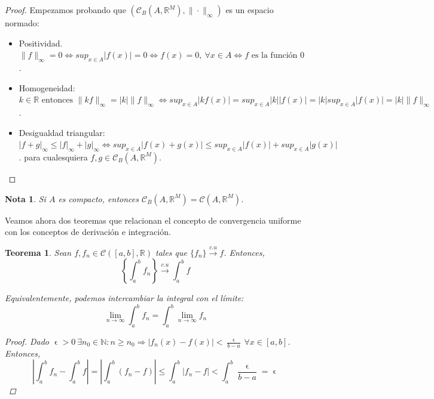 \documentclass[11pt, a4paper]{article}
\let\epsilon\upvarepsilon
\newcommand{\fn}{\{f_n\}}
\theoremstyle{theorem-style}
\newtheorem{nth}{Teorema}[section]
\theoremstyle{definition-style}
\theoremstyle{remark-style}
\newtheorem*{nota}{Nota}
\theoremstyle{example-style}
\begin{document}
\begin{proof}
	Empezamos probando que $(\mathcal{C}_B(A, \mathbb R^M), \|\cdot \|_\infty)$ es un espacio normado:
	\begin{itemize}
\item Positividad. $\|f\|_\infty=0 \iff sup_{x \in A}|f(x)|=0 \iff f(x)=0, \ \forall x \in A \iff f \text{ es la función } 0$.
\item Homogeneidad: $k \in \mathbb R \text{ entonces } \|kf\|_\infty=|k|\|f\|_\infty \iff sup_{x \in A}|kf(x)|=sup_{x \in A}|k||f(x)|=|k|sup_{x \in A}|f(x)| = |k| \| f\|_\infty$.
\item Desigualdad triangular:
$|f+g|_\infty \leq |f|_\infty + |g|_\infty\iff sup_{x \in A}|f(x)+g(x)| \leq sup_{x \in A}|f(x)| + sup_{x \in A}|g(x)|$.
para cualesquiera $f, g \in \mathcal{C}_B(A, \mathbb R^M)$.
\end{itemize}
\end{proof}

\begin{nota}
Si $A$ es compacto, entonces  $\mathcal{C}_B(A,\mathbb{R}^M) = \mathcal{C}(A, \mathbb{R}^M)$.
\end{nota}

Veamos ahora dos teoremas que relacionan el concepto de convergencia uniforme con los conceptos de derivación e integración.

\begin{nth} Sean $f, f_n \in \mathcal{C}([a,b],\mathbb{R})$ tales que $\fn \xrightarrow {c.u} f$. Entonces, $$\left\{\int_a^b f_n\right\} \xrightarrow {c.u} \int_a^b f $$

Equivalentemente, podemos intercambiar la integral con el límite: $$\lim_{n\rightarrow \infty} \int_a^b f_n = \int_a^b \lim_{n\rightarrow \infty} f_n$$

\begin{proof} Dado $\displaystyle \epsilon >0\ \exists n_0 \in \mathbb{N}: n \ge n_0 \Rightarrow |f_n(x)-f(x)| < \frac{\epsilon}{b-a}\ \forall x \in [a,b]$. Entonces, $$\left| \int_a^b f_n - \int _a^b f \right| = \left| \int_a^b (f_n - f) \right| \le \int_a^b |f_n - f| < \int_a^b \frac{\epsilon}{b-a} = \epsilon$$
\end{proof}
\end{nth}
\end{document}
